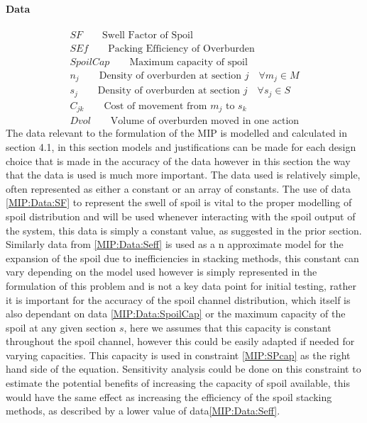 \paragraph*{Data}
\begin{align}
\label{MIP:Data:SF}
SF \qquad \text{Swell Factor of Spoil}\\
\label{MIP:Data:Seff}
SEf \qquad \text{Packing Efficiency of Overburden}\\
\label{MIP:Data:SpoilCap}
SpoilCap \qquad \text{Maximum capacity of spoil}\\
\label{MIP:Data:n}
n_{j} \qquad \text{Density of overburden at section $j$} \quad \forall m_{j}  \in M\\
\label{MIP:Data:s}
s_{j} \qquad \text{Density of overburden at section $j$} \quad \forall s_{j}  \in S\\
\label{MIP:Cost}
C_{jk} \qquad \text{Cost of movement from $m_{j}$ to $s_k$ }\\
\label{MIPDvol}
Dvol \qquad \text{Volume of overburden moved in one action}
\end{align}
The data relevant to the formulation of the MIP is modelled and calculated in section 4.1, in this section models and justifications can be made for each design choice that is made in the accuracy of the data however in this section the way that the data is used is much more important. The data used is relatively simple, often represented as either a constant or an array of constants. The use of data \ref{MIP:Data:SF} to represent the swell of spoil is vital to the proper modelling of spoil distribution and will be used whenever interacting with the spoil output of the system, this data is simply a constant value, as suggested in the prior section. Similarly data from \ref{MIP:Data:Seff} is used as a n approximate model for the expansion of the spoil due to inefficiencies in stacking methods, this constant can vary depending on the model used however is simply represented in the formulation of this problem and is not a key data point for initial testing, rather it is important for the accuracy of the spoil channel distribution, which itself is also dependant on data \ref{MIP:Data:SpoilCap} or the maximum capacity of the spoil at any given section $s$, here we assumes that this capacity is constant throughout the spoil channel, however this could be easily adapted if needed for varying capacities. This capacity is used in constraint \ref{MIP:SPcap} as the right hand side of the equation. Sensitivity analysis could be done on this constraint to estimate the potential benefits of increasing the capacity of spoil available, this would have the same effect as increasing the efficiency of the spoil stacking methods, as described by a lower value of data\ref{MIP:Data:Seff}.\\

